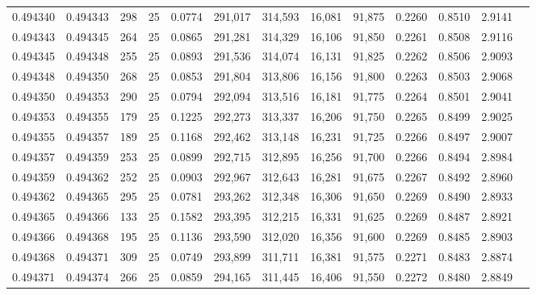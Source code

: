 \begin{tabular}{rrrrrrrrrrrrr}
0.494340 & 0.494343 &   298 &  25 &                                     0.0774 & 291,017 & 314,593 &  16,081 &  91,875 & 0.2260 & 0.8510 & 2.9141 \\
0.494343 & 0.494345 &   264 &  25 &                                     0.0865 & 291,281 & 314,329 &  16,106 &  91,850 & 0.2261 & 0.8508 & 2.9116 \\
0.494345 & 0.494348 &   255 &  25 &                                     0.0893 & 291,536 & 314,074 &  16,131 &  91,825 & 0.2262 & 0.8506 & 2.9093 \\
0.494348 & 0.494350 &   268 &  25 &                                     0.0853 & 291,804 & 313,806 &  16,156 &  91,800 & 0.2263 & 0.8503 & 2.9068 \\
0.494350 & 0.494353 &   290 &  25 &                                     0.0794 & 292,094 & 313,516 &  16,181 &  91,775 & 0.2264 & 0.8501 & 2.9041 \\
0.494353 & 0.494355 &   179 &  25 &                                     0.1225 & 292,273 & 313,337 &  16,206 &  91,750 & 0.2265 & 0.8499 & 2.9025 \\
0.494355 & 0.494357 &   189 &  25 &                                     0.1168 & 292,462 & 313,148 &  16,231 &  91,725 & 0.2266 & 0.8497 & 2.9007 \\
0.494357 & 0.494359 &   253 &  25 &                                     0.0899 & 292,715 & 312,895 &  16,256 &  91,700 & 0.2266 & 0.8494 & 2.8984 \\
0.494359 & 0.494362 &   252 &  25 &                                     0.0903 & 292,967 & 312,643 &  16,281 &  91,675 & 0.2267 & 0.8492 & 2.8960 \\
0.494362 & 0.494365 &   295 &  25 &                                     0.0781 & 293,262 & 312,348 &  16,306 &  91,650 & 0.2269 & 0.8490 & 2.8933 \\
0.494365 & 0.494366 &   133 &  25 &                                     0.1582 & 293,395 & 312,215 &  16,331 &  91,625 & 0.2269 & 0.8487 & 2.8921 \\
0.494366 & 0.494368 &   195 &  25 &                                     0.1136 & 293,590 & 312,020 &  16,356 &  91,600 & 0.2269 & 0.8485 & 2.8903 \\
0.494368 & 0.494371 &   309 &  25 &                                     0.0749 & 293,899 & 311,711 &  16,381 &  91,575 & 0.2271 & 0.8483 & 2.8874 \\
0.494371 & 0.494374 &   266 &  25 &                                     0.0859 & 294,165 & 311,445 &  16,406 &  91,550 & 0.2272 & 0.8480 & 2.8849 \\

\end{tabular}
